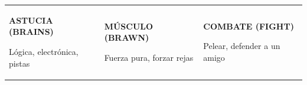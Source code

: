 \documentclass[10pt,a4paper,oneside]{book}
\begin{document}
\vspace{1mm}
\noindent
\begin{tabularx}{\linewidth}{X X X}
  \colorbox{BluePale}{\parbox{\dimexpr\linewidth-2\fboxsep\relax}{
    \textcolor{AceroNervion}{\industrialfont\bfseries\small ASTUCIA (BRAINS)}\par
    \vspace{1mm}\terminalfont\scriptsize Lógica, electrónica, pistas\par
    \vspace{2mm}\centering{\industrialfont\bfseries\Large [ \hspace{8mm} ]}
  }} &
  \colorbox{RustPale}{\parbox{\dimexpr\linewidth-2\fboxsep\relax}{
    \textcolor{OxidoSestao}{\industrialfont\bfseries\small MÚSCULO (BRAWN)}\par
    \vspace{1mm}\terminalfont\scriptsize Fuerza pura, forzar rejas\par
    \vspace{2mm}\centering{\industrialfont\bfseries\Large [ \hspace{8mm} ]}
  }} &
  \colorbox{BluePale}{\parbox{\dimexpr\linewidth-2\fboxsep\relax}{
    \textcolor{AceroNervion}{\industrialfont\bfseries\small COMBATE (FIGHT)}\par
    \vspace{1mm}\terminalfont\scriptsize Pelear, defender a un amigo\par
    \vspace{2mm}\centering{\industrialfont\bfseries\Large [ \hspace{8mm} ]}
  }}
\end{tabularx}
\end{document}
